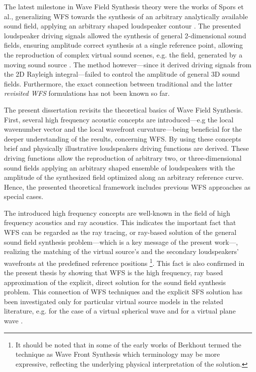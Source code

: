 The latest milestone in Wave Field Synthesis theory were the works of Spors et al., generalizing WFS towards the synthesis of an arbitrary analytically available sound field, applying an arbitrary shaped loudspeaker contour \cite{Spors2008:WFSrevisited, Rabenstein2007}.
The presented loudspeaker driving signals allowed the synthesis of general 2-dimensional sound fields, ensuring amplitude correct synthesis at a single reference point,
allowing the reproduction of complex virtual sound scenes, e.g. the field, generated by a moving sound source \cite{Ahrens2008moving, Ahrens2008moving_b, Ahrens2011_moving_source_WFS}.
The method however---since it derived driving signals from the 2D Rayleigh integral---failed to control the amplitude of general 3D sound fields.
Furthermore, the exact connection between traditional and the latter \emph{revisited WFS} formulations has not been known so far.

\vspace{3mm}
The present dissertation revisits the theoretical basics of Wave Field Synthesis.
First, several high frequency acoustic concepts are introduced---e.g the local wavenumber vector and the local wavefront curvature---being beneficial for the deeper understanding of the results, concerning WFS.
By using these concepts brief and physically illustrative loudspeakers driving functions are derived.
These driving functions allow the reproduction of arbitrary two, or three-dimensional sound fields applying an arbitrary shaped ensemble of loudspeakers with the amplitude of the synthesized field optimized along an arbitrary reference curve.
Hence, the presented theoretical framework includes previous WFS approaches as special cases.

The introduced high frequency concepts are well-known in the field of high frequency acoustics and ray acoustics.
This indicates the important fact that WFS can be regarded as the ray tracing, or ray-based solution of the general sound field synthesis problem---which is a key message of the present work---, realizing the matching of the virtual source's and the secondary loudspeakers' wavefronts at the predefined reference positions \footnote{It should be noted that in some of the early works of Berkhout termed the technique as Wave Front Synthesis \cite{berkhout1992wave, doi:10.1121/1.404755} which terminology may be more expressive, reflecting the underlying physical interpretation of the solution.}.
This fact is also confirmed in the present thesis by showing that WFS is the high frequency, ray based approximation of the explicit, direct solution for the sound field synthesis problem.
This connection of WFS techniques and the explicit SFS solution has been investigated only for particular virtual source models in the related literature, e.g. for the case of a virtual spherical wave \cite{Spors2010:analysis_and_improvement} and for a virtual plane wave \cite{Schultz2016:DAGA}.

